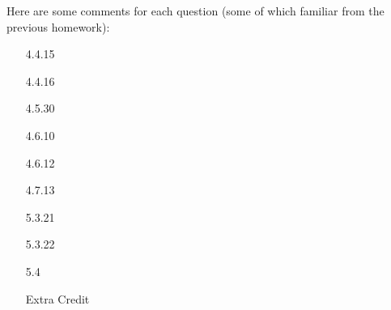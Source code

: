 \documentclass{amsart}
\theoremstyle{definition}
\theoremstyle{definition}
\DeclareMathOperator{\1}{\mathbbm{1}}
\begin{document}
\noindent Here are some comments for each question (some of which familiar from the previous homework):

\bigskip

\begin{enumerate}[itemsep = 2mm]
	\item[4.4.15]
	
	
	
	\item[4.4.16]
	
	
	
	
	\item[4.5.30]
	
	
	
	
	\item[4.6.10]
	
	
	
	\item[4.6.12]
	
	
	
	
	\item[4.7.13]
	
	
	
	
	\item[5.3.21]
	
	
	
	
	\item[5.3.22]
	
	
	
	
	\item[5.4]
	
	
	
	
	
	\item[Extra Credit]
\end{enumerate}

	
\end{document}
